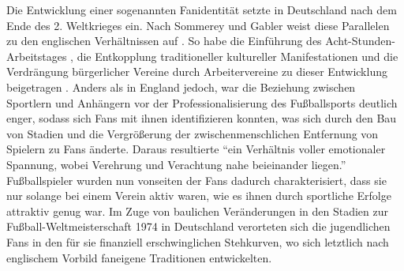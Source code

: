 Die Entwicklung einer sogenannten Fanidentität setzte in Deutschland nach dem Ende des 2. Weltkrieges ein.
Nach Sommerey und Gabler weist diese Parallelen zu den englischen Verhältnissen auf \cite[S. 28]{MS12}.
So habe die Einführung des Acht-Stunden-Arbeitstages \cite[S. 20]{JG11}, die Entkopplung traditioneller kultureller Manifestationen und die Verdrängung bürgerlicher Vereine durch Arbeitervereine zu dieser Entwicklung beigetragen \cite[S. 29]{MS12}.
Anders als in England jedoch, war die Beziehung zwischen Sportlern und Anhängern vor der Professionalisierung des Fußballsports deutlich enger, sodass sich Fans mit ihnen identifizieren konnten, was sich durch den Bau von Stadien und die Vergrößerung der zwischenmenschlichen Entfernung von Spielern zu Fans änderte.
Daraus resultierte "`ein Verhältnis voller emotionaler Spannung, wobei Verehrung und Verachtung nahe beieinander liegen."' \cite[S. 29]{MS12}
Fußballspieler wurden nun vonseiten der Fans dadurch charakterisiert, dass sie nur solange bei einem Verein aktiv waren, wie es ihnen durch sportliche Erfolge attraktiv genug war.
Im Zuge von baulichen Veränderungen in den Stadien zur Fußball-Weltmeisterschaft 1974 in Deutschland verorteten sich die jugendlichen Fans in den für sie finanziell erschwinglichen Stehkurven, wo sich letztlich nach englischem Vorbild faneigene Traditionen entwickelten.
